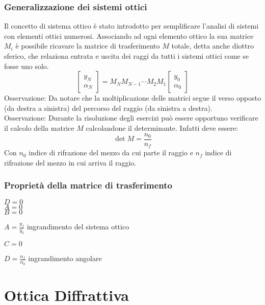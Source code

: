 \documentclass{article}
\begin{document}
\subsubsection*{Generalizzazione dei sistemi ottici}
Il concetto di sistema ottico è stato introdotto per semplificare l'analisi di sistemi con elementi ottici numerosi. Associando ad ogni elemento ottico la sua matrice $M_i$ è possibile ricavare la matrice di trasferimento $M$ totale, detta anche diottro sferico, che relaziona entrata e uscita dei raggi da tutti i sistemi ottici come se fosse uno solo.
\[
\begin{bmatrix}
y_N\\
\alpha_N
\end{bmatrix}
=
M_N M_{N-1} \cdots M_2 M_1
\begin{bmatrix}
y_0\\
\alpha_0
\end{bmatrix}
\]
Osservazione:
Da notare che la moltiplicazione delle matrici segue il verso opposto (da destra a sinistra) del percorso del raggio (da sinistra a destra).\\
Osservazione:
Durante la risoluzione degli esercizi può essere opportuno verificare il calcolo della matrice $M$ calcolandone il determinante. Infatti deve essere:
\begin{equation*}
\det M = \frac{n_0}{n_f}
\end{equation*}
Con $n_0$ indice di rifrazione del mezzo da cui parte il raggio e $n_f$ indice di rifrazione del mezzo in cui arriva il raggio.

\subsubsection*{Proprietà della matrice di trasferimento}
$D = 0$\\
$A = 0$\\
$B = 0$\\
\centerline{$A = \frac{y_f}{y_0}$ \qquad ingrandimento del sistema ottico}
$C = 0$\\
\centerline{$D = \frac{\alpha_f}{\alpha_0}$	\qquad ingrandimento angolare}


\section*{Ottica Diffrattiva}
\end{document}

